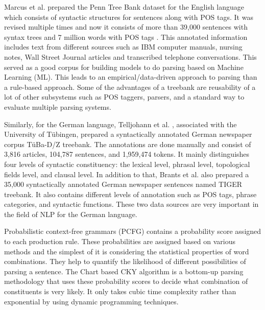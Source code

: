 \documentclass[a4paper, 11pt]{article}
\begin{document}

Marcus et al.\parencite{Marcus1993} prepared the Penn Tree Bank dataset for the English language which consists of syntactic structures for sentences along with POS tags. It was revised multiple times and now it consists of more than 39,000 sentences with syntax trees and 7 million words with POS tags \parencite{Taylor2003}. This annotated information includes text from different sources such as IBM computer manuals, nursing notes, Wall Street Journal articles and transcribed telephone conversations. This served as a good corpus for building models to do parsing based on Machine Learning (ML). This leads to an empirical/data-driven approach to parsing than a rule-based approach. Some of the advantages of a treebank are reusability of a lot of other subsystems such as POS taggers, parsers, and a standard way to evaluate multiple parsing systems. 

Similarly, for the German language, Telljohann et al. \parencite{TubingenTreebank}, \parencite{Telljohann04thetuba} associated with the University of Tübingen, prepared a syntactically annotated German newspaper corpus TüBa-D/Z treebank. The annotations are done manually and consist of 3,816 articles, 104,787 sentences, and 1,959,474 tokens. It mainly distinguishes four levels of syntactic constituency: the lexical level, phrasal level, topological fields level, and clausal level. In addition to that, Brants et al. \parencite{Brants2002TheTT} also prepared a 35,000 syntactically annotated German newspaper sentences named TIGER treebank. It also contains different levels of annotation such as POS tags, phrase categories, and syntactic functions. These two data sources are very important in the field of NLP for the German language. 


Probabilistic context-free grammars (PCFG) \parencite{4569603} contains a probability score assigned to each production rule. These probabilities are assigned based on various methods and the simplest of it is considering the statistical properties of word combinations. They help to quantify the likelihood of different possibilities of parsing a sentence. The Chart based CKY \parencite{YOUNGER1967189} algorithm is a bottom-up parsing methodology that uses these probability scores to decide what combination of constituents is very likely. It only takes cubic time complexity rather than exponential by using dynamic programming techniques. 
\end{document}
